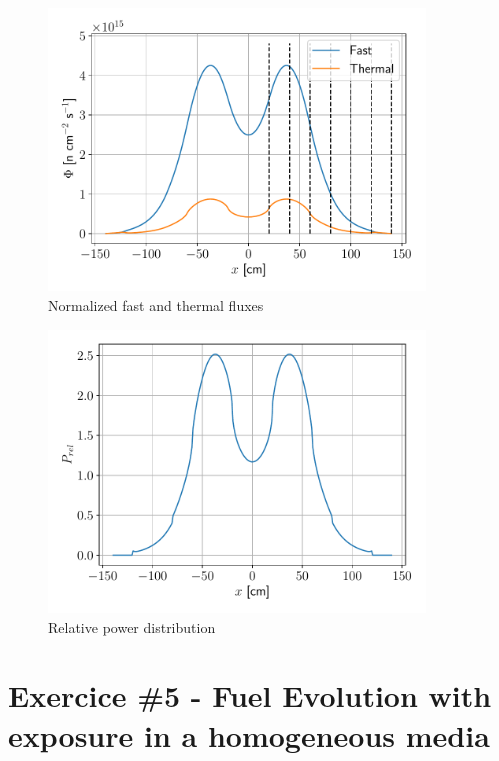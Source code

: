 \documentclass[11pt,a4paper]{article}
\begin{document}
\begin{figure}[H]
	\includegraphics[width=10cm]{fig/Ex4_Flux_opti.pdf}
	\centering
	\caption{Normalized fast and thermal fluxes}
\end{figure}

\begin{figure}[H]
	\includegraphics[width=10cm]{fig/Ex4_Power_opti.pdf}
	\centering
	\caption{Relative power distribution}
\end{figure}






\newpage
\section{Exercice \#5 - Fuel Evolution with exposure in a homogeneous media}
\end{document}
